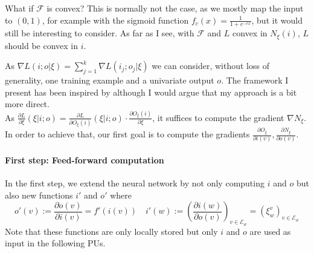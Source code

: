 \documentclass[a4paper,11pt]{article}
\begin{document}
\begin{OP}
What if $\mathcal{F}$ is convex? This is normally not the case, as we mostly map the input to $(0,1)$, for example with the sigmoid function $f_c(x)=\frac{1}{1+e^{-cx}}$, but it would still be interesting to consider. As far as I see, with $\mathcal{F}$ and $L$ convex in $N_{\xi}(i)$, $L$ should be convex in $i$.
\end{OP}
As $\nabla L(i;o|\xi)=\sum_{j=1}^k\nabla L(i_j;o_j|\xi)$ we can consider, without loss of generality, one training example and a univariate output $o$. The framework I present has been inspired by \cite{Rojas1996} although I would argue that my approach is a bit more direct.\\
As $\frac{\partial L}{\partial \xi}(\xi|i;o)=\frac{\partial L}{\partial O_{\xi}(i)}(\xi|i;o)\cdot\frac{\partial O_{\xi}(i)}{\partial\xi}$, it suffices to compute the gradient $\nabla N_{\xi}$. In order to achieve that, our first goal is to compute the gradients $\frac{\partial O_{\xi}}{\partial i(v)},\frac{\partial N_{\xi}}{\partial o(v)}$.
\paragraph{First step: Feed-forward computation}
In the first step, we extend the neural network by not only computing $i$ and $o$ but also new functions $i'$ and $o'$ where
\begin{equation}
o'(v):=\frac{\partial o(v)}{\partial i(v)}=f'\left(i(v)\right)
\quad
i'(w):=\left(\frac{\partial i(w)}{\partial o(v)}\right)_{v\in\mathcal{E}_w}=\left(\xi^v_w\right)_{v\in\mathcal{E}_w}
\end{equation}
Note that these functions are only locally stored but only $i$ and $o$ are used as input in the following PUs.
\end{document}
